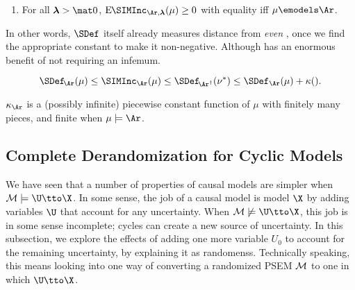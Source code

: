 \begin{subappendices}
{\begin{prop}
    \begin{enumerate}[label={\normalfont(\alph*)},wide]
    \item For all $\boldsymbol{\lambda} > \mat 0$, $\mathrm{E}\mskip-1mu\SIMInc_{\Ar, \boldsymbol\lambda}(\mu) \ge 0$ with equality iff $\mu \emodels \Ar$.
    \end{enumerate}
\end{prop}

In other words, $\SDef$ itself already measures distance from \emph{even \scibility}, once we find the appropriate constant to make it non-negative. 
Although has an enormous benefit of not requiring an infemum. 

\[
    \SDef_{\!\Ar}(\mu)
    \le \SIMInc_{\Ar}(\mu)
    \le \SDef_{\!\Ar^\dagger}(\nu^*)
    \le \SDef_{\Ar}(\mu) + \kappa()
    .
\]

$\kappa_\Ar$ is a (possibly infinite) piecewise constant function of $\mu$ with finitely many pieces,
and finite when $\mu \models \Ar$. 

\subsection{Complete Derandomization for Cyclic Models}
    \label{ssec:full-derandomize}
We have seen that a number of properties of causal models are simpler when $\mathcal M \models \U \tto \X$. 
In some sense, the job of a causal model is model $\X$ by adding variables $\U$ that account for any uncertainty. 
When $\mathcal M \not\models \U \tto \X$, this job is in some sense incomplete; cycles can create a new source of uncertainty. 
In this subsection, we explore the effects of adding one more variable $U_0$ to account for the remaining uncertainty, by explaining it as randomenss.
Technically speaking, this means looking into one way of converting a 
    randomized PSEM $\cal M$ to one in which $\U \tto \X$.


}
\end{subappendices}
